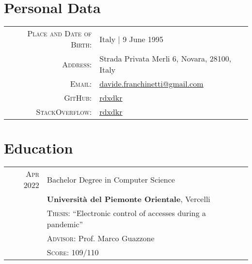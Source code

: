 \documentclass[a4paper,10pt]{article} %
\begin{document}
\pagestyle{empty} %


\par{\bigskip\par} %

\section{Personal Data}

\begin{tabular}{rl}
\textsc{Place and Date of Birth:} & Italy | 9 June 1995 \\
\textsc{Address:} & Strada Privata Merli 6, Novara, 28100, Italy \\
\textsc{Email:} & \href{mailto:davide.franchinetti@gmail.com}{\underline{davide.franchinetti@gmail.com}}\\
\textsc{GitHub:} & \href{https://github.com/rdxdkr}{\underline{rdxdkr}}\\
\textsc{StackOverflow:} & \href{https://stackoverflow.com/users/9212745/rdxdkr}{\underline{rdxdkr}}\\
\end{tabular}


\section{Education}

\begin{tabular}{rl}	
\textsc{Apr 2022} & Bachelor Degree in Computer Science\\
& \textbf{Università del Piemonte Orientale}, Vercelli\\
& \textsc{Thesis:} ``Electronic control of accesses during a pandemic''\\
& \small \textsc{Advisor:} Prof. Marco Guazzone\\
& \normalsize \textsc{Score:} 109/110\\
\end{tabular}
\end{document}
